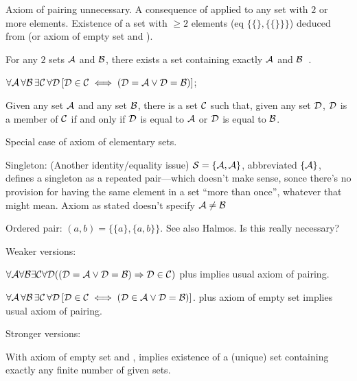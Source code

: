 Axiom of pairing unnecessary.
A consequence of 
applied to any set with $2$ or more elements.
Existence of a set with $\geq 2$ elements
(eq $\{ \{\}, \{ \{\} \} \}$)
deduced from 
(or axiom of empty set\cite{wiki:Axiom_of_empty_set}
and ).

For any $2$ sets $\mathcal{A}$ and $\mathcal{B}$,
there exists a set containing exactly $\mathcal{A}$ and 
$\mathcal{B}$~\cite{wiki:Axiom_of_pairing}.

$\forall \mathcal{A}\,\forall \mathcal{B}\,\exists \mathcal{C}\,\forall \mathcal{D}\,
[\mathcal{D}\in \mathcal{C}\iff (\mathcal{D}=\mathcal{A}\lor \mathcal{D}=\mathcal{B})]$;

Given any set $\mathcal{A}$ and any set $\mathcal{B}$, 
there is a set $\mathcal{C}$ such that, 
given any set $\mathcal{D}$, 
$\mathcal{D}$ is a member of $\mathcal{C}$ 
if and only if 
$\mathcal{D}$ is equal to $\mathcal{A}$ 
or 
$\mathcal{D}$ is equal to $\mathcal{B}$.

Special case of axiom of elementary 
sets\cite{wiki:Zermelo_set_theory}.

Singleton:
(Another identity/equality issue)
$\mathcal{S}=\{\mathcal{A},\mathcal{A}\}$, abbreviated $\{\mathcal{A}\}$,
defines a singleton as a repeated pair---which doesn't make sense,
sonce there's no provision for having the same element
in a set ``more than once'', whatever that might mean.
Axiom as stated doesn't specify $\mathcal{A} \neq \mathcal{B}$

Ordered pair:
$(a,b)=\{\{a\},\{a,b\}\}$.
See also Halmos\cite{Halmos1960Naive}.
Is this really necessary? 

Weaker versions:
 
${\displaystyle 
\forall \mathcal{A} \forall \mathcal{B} 
\exists \mathcal{C}
\forall \mathcal{D}((\mathcal{D}=\mathcal{A}\lor \mathcal{D}=\mathcal{B}) \Rightarrow \mathcal{D}\in \mathcal{C})}$
plus 
implies usual axiom of pairing.

${\displaystyle 
\forall \mathcal{A}\,\forall \mathcal{B}\,
\exists \mathcal{C}\,
\forall \mathcal{D}\,[\mathcal{D}\in \mathcal{C}
\iff (\mathcal{D}\in \mathcal{A}\lor \mathcal{D}=\mathcal{B})]}$.
plus 
axiom of empty set
implies usual axiom of pairing.

Stronger versions:

With axiom of empty set\cite{wiki:Axiom_of_empty_set} 
and ,
implies existence of a (unique) set containing exactly
any finite number of given sets.

\label{sec:Axiom-of-union}

